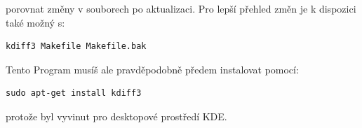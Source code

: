 porovnat změny v souborech po aktualizaci. Pro lepší přehled změn je k dispozici také možný s:
\begin{large} \vspace{-0.4em} \begin{verbatim}
kdiff3 Makefile Makefile.bak
\end{verbatim} \end{large}

Tento Program musíš ale pravděpodobně předem instalovat pomocí:
\begin{large} \vspace{-0.4em} \begin{verbatim}
sudo apt-get install kdiff3
\end{verbatim} \end{large}

protože byl vyvinut pro desktopové prostředí KDE.

\newpage
